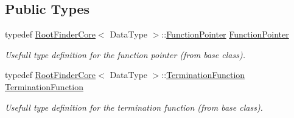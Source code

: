 \subsection*{Public Types}
\begin{DoxyCompactItemize}
\item 
typedef \hyperlink{classtudat_1_1root__finders_1_1RootFinderCore}{Root\+Finder\+Core}$<$ Data\+Type $>$\+::\hyperlink{classtudat_1_1root__finders_1_1RootFinderCore_af0bb889d21fa3bc55785021381d3b4b5}{Function\+Pointer} \hyperlink{classtudat_1_1root__finders_1_1SecantRootFinderCore_a54d7869a1af372fdd2d31d58fe39a895}{Function\+Pointer}\hypertarget{classtudat_1_1root__finders_1_1SecantRootFinderCore_a54d7869a1af372fdd2d31d58fe39a895}{}\label{classtudat_1_1root__finders_1_1SecantRootFinderCore_a54d7869a1af372fdd2d31d58fe39a895}

\begin{DoxyCompactList}\small\item\em Usefull type definition for the function pointer (from base class). \end{DoxyCompactList}\item 
typedef \hyperlink{classtudat_1_1root__finders_1_1RootFinderCore}{Root\+Finder\+Core}$<$ Data\+Type $>$\+::\hyperlink{classtudat_1_1root__finders_1_1RootFinderCore_a8dd4dc4316b5e984e279816e0a2b67d5}{Termination\+Function} \hyperlink{classtudat_1_1root__finders_1_1SecantRootFinderCore_aaaecce4a5b26714ca8f700ae8529d2f4}{Termination\+Function}\hypertarget{classtudat_1_1root__finders_1_1SecantRootFinderCore_aaaecce4a5b26714ca8f700ae8529d2f4}{}\label{classtudat_1_1root__finders_1_1SecantRootFinderCore_aaaecce4a5b26714ca8f700ae8529d2f4}

\begin{DoxyCompactList}\small\item\em Usefull type definition for the termination function (from base class). \end{DoxyCompactList}\end{DoxyCompactItemize}
